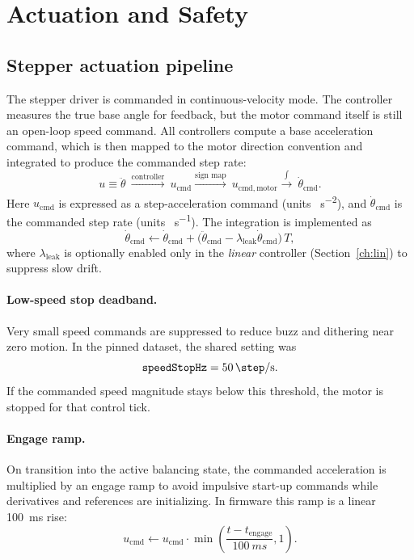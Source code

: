 \section{Actuation and Safety}
\label{ch:actuation}

\subsection{Stepper actuation pipeline}
The stepper driver is commanded in continuous-velocity mode. The controller measures the true base angle for feedback, but the motor command itself is still an open-loop speed command. All controllers compute a base acceleration command, which is then mapped to the motor direction convention and integrated to produce the commanded step rate:
\[
u \equiv \ddot{\theta}\ \xrightarrow{\text{controller}}\ u_{\mathrm{cmd}}
\xrightarrow{\text{sign map}}\ u_{\mathrm{cmd,motor}}
\xrightarrow{\int}\ \dot{\theta}_{\mathrm{cmd}}.
\]
Here $u_{\mathrm{cmd}}$ is expressed as a step-acceleration command (units \si{\step\per\second\squared}), and $\dot{\theta}_{\mathrm{cmd}}$ is the commanded step rate (units \si{\step\per\second}).
The integration is implemented as
\[
\dot{\theta}_{\mathrm{cmd}} \leftarrow \dot{\theta}_{\mathrm{cmd}} + \bigl(\ddot{\theta}_{\mathrm{cmd}} - \lambda_{\mathrm{leak}}\dot{\theta}_{\mathrm{cmd}}\bigr)\,T,
\]
where $\lambda_{\mathrm{leak}}$ is optionally enabled only in the \emph{linear} controller (Section~\ref{ch:lin}) to suppress slow drift.

\paragraph{Low-speed stop deadband.}
Very small speed commands are suppressed to reduce buzz and dithering near zero motion. In the pinned dataset, the shared setting was
\[
\texttt{speedStopHz} = \SI{50}{\step\per\second}.
\]
If the commanded speed magnitude stays below this threshold, the motor is stopped for that control tick.

\paragraph{Engage ramp.}
On transition into the active balancing state, the commanded acceleration is multiplied by an engage ramp to avoid impulsive start-up commands while derivatives and references are initializing. In firmware this ramp is a linear \SI{100}{ms} rise:
\[
u_{\mathrm{cmd}} \leftarrow u_{\mathrm{cmd}}\cdot \min\!\left(\frac{t-t_{\mathrm{engage}}}{\SI{100}{ms}},1\right).
\]

